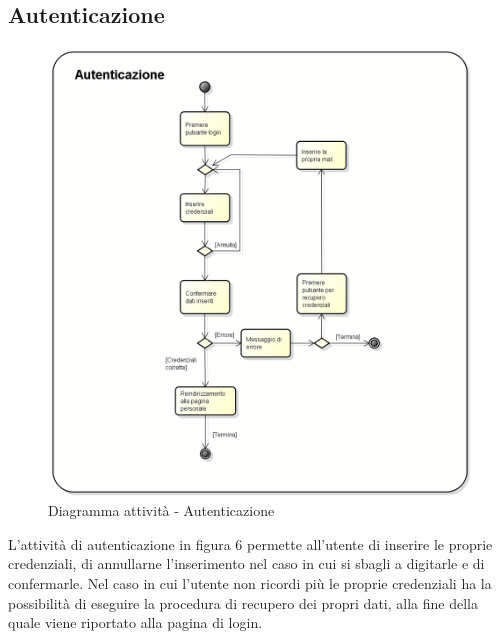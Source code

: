 \subsection{Autenticazione}
\begin{figure}[h] 
	\centering 
	\includegraphics[scale=0.3] {img/activity_autenticazione.png} 
	\caption{Diagramma attività - Autenticazione} 
\end{figure}
L'attività di autenticazione in figura 6 permette all'utente di inserire le proprie credenziali, di annullarne l'inserimento nel caso in cui si sbagli a digitarle e di confermarle. Nel caso in cui l'utente non ricordi più le proprie credenziali ha la possibilità di eseguire la procedura di recupero dei propri dati, alla fine della quale viene riportato alla pagina di login.
\newpage


